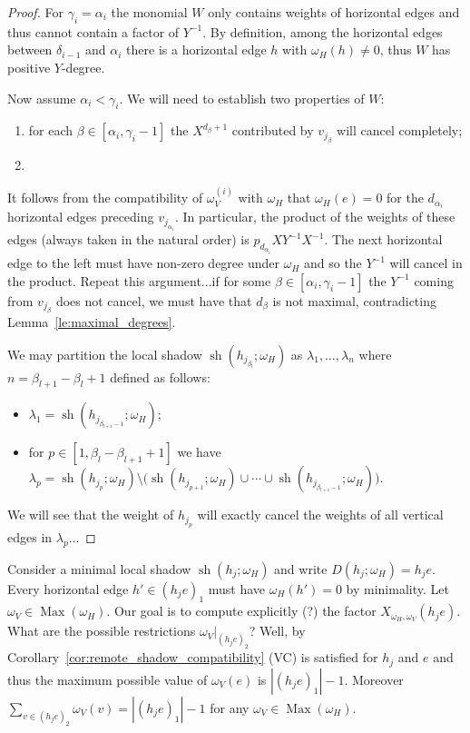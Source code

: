 \documentclass{amsart}
\newcommand{\Max}{\operatorname{Max}}
\newcommand{\sh}{\operatorname{sh}}
\begin{document}
 \begin{proof}
  For $\gamma_i=\alpha_i$ the monomial $W$ only contains weights of horizontal edges and thus cannot contain a factor of $Y^{-1}$.  By definition, among the horizontal edges between $\delta_{i-1}$ and $\alpha_i$ there is a horizontal edge $h$ with $\omega_H(h)\ne0$, thus $W$ has positive $Y$-degree.

  Now assume $\alpha_i<\gamma_i$.  We will need to establish two properties of $W$:
  \begin{enumerate}
   \item for each $\beta\in[\alpha_i,\gamma_i-1]$ the $X^{d_\beta+1}$ contributed by $v_{j_\beta}$ will cancel completely;
   \item 
  \end{enumerate}

  It follows from the compatibility of $\omega_V^{(i)}$ with $\omega_H$ that $\omega_H(e)=0$ for the $d_{\alpha_i}$ horizontal edges preceding $v_{j_{\alpha_i}}$.  In particular, the product of the weights of these edges (always taken in the natural order) is $p_{d_{\alpha_i}}XY^{-1}X^{-1}$.  The next horizontal edge to the left must have non-zero degree under $\omega_H$ and so the $Y^{-1}$ will cancel in the product.  Repeat this argument...if for some $\beta\in[\alpha_i,\gamma_i-1]$ the $Y^{-1}$ coming from $v_{j_\beta}$ does not cancel, we must have that $d_\beta$ is not maximal, contradicting Lemma~\ref{le:maximal_degrees}.

  We may partition the local shadow $\sh(h_{j_{\beta_l}};\omega_H)$ as $\lambda_1,\ldots,\lambda_n$ where $n=\beta_{l+1}-\beta_l+1$ defined as follows:
  \begin{itemize}
   \item $\lambda_1=\sh(h_{j_{\beta_{l+1}-1}};\omega_H)$;
   \item for $p\in[1,\beta_l-\beta_{l+1}+1]$ we have $\lambda_p=\sh(h_{j_p};\omega_H)\setminus \big(\sh(h_{j_{p+1}};\omega_H)\cup\cdots\cup\sh(h_{j_{\beta_{l+1}-1}};\omega_H)\big)$.
  \end{itemize}
  We will see that the weight of $h_{j_p}$ will exactly cancel the weights of all vertical edges in $\lambda_p$...
 \end{proof}

 
 Consider a minimal local shadow $\sh(h_j;\omega_H)$ and write $D(h_j;\omega_H)=h_je$.  Every horizontal edge $h'\in(h_je)_1$ must have $\omega_H(h')=0$ by minimality.  Let $\omega_V\in\Max(\omega_H)$.  Our goal is to compute explicitly (?) the factor $X_{\omega_H,\omega_V}(h_je)$.  What are the possible restrictions $\omega_V\Big|_{(h_je)_2}$?  Well, by Corollary~\ref{cor:remote_shadow_compatibility} (VC) is satisfied for $h_j$ and $e$ and thus the maximum possible value of $\omega_V(e)$ is $|(h_je)_1|-1$.  Moreover $\sum\limits_{v\in(h_je)_2}\omega_V(v)=|(h_je)_1|-1$ for any $\omega_V\in\Max(\omega_H)$.  
\end{document}
